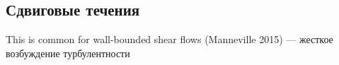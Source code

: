 \begin{comment}
In open flows where no boundaries limit the flow in the wall-normal direction, horseshoe or hairpin shaped vortices are commonly observed (Head and Bandyopadhyay, 1981; Robinson, 1991; Adrian et al., 2000; Adrian, 2007). Close to the wall, these structures are similar to a counter-rotating vortex pair, but they are inclined and extend further into the free stream, where they are connected, forming a hairpin shaped structure. The concept goes back more than half a century to Theodorsen (1952), an illustration is reproduced in figure 1.2.1(b). To better understand the dynamical properties of these typical flow structures, simulations are often performed in so-called minimal flow units defined by the fact that turbulence cannot be sustained if any of the dimensions is reduced (Jiménez and Moin, 1991), with some freedom in the definition of sustained turbulence and the ratio of the dimensions. The concept is useful because it allows to extract features of turbulence which are otherwise obfuscated by spatial processes and because a small periodic domain is cheaper in numerical simulations. In such a minimal flow unit, a self-sustaining cycle of near-wall turbulence has been identified (Hamilton et al., 1995; Waleffe, 1997, 2003), connecting the typical flow structures and their instabilities. The cycle starts with a pair of counter-rotating streamwise-aligned vortices, which create a pair of streaks through the lift-up effect. The streaks, initially straight, are linearly unstable to developing a wavy modulation, and the period in which the streaks are created is about as long as the subsequent period during which the instabilities grow. As the modulation becomes too strong, the structures break up, leaving behind a flow with strong downstream variations. The cycle is closed by nonlinear interactions recreating the downstream vortices. This so called self-sustaining process is found in many shear flows and was, for example, observed experimentally by Duriez et al. (2009). It also served as the stimulus for making an analogy between fluid mechanics and magnetohydrodynamic dynamos (Riols et al., 2013). 
\end{comment}

	\subsection{Сдвиговые течения}

This is common for wall-bounded shear flows (Manneville 2015) --- жесткое возбуждение турбулентности


